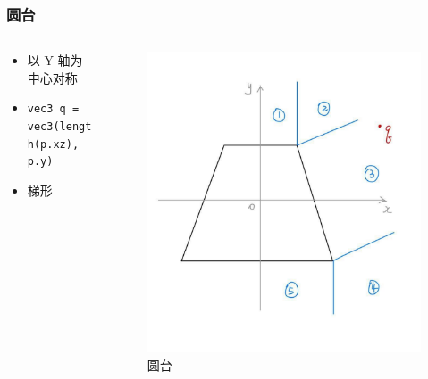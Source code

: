 \documentclass[aspectratio=169]{ctexbeamer} %
\begin{document}
\begin{frame}
    \frametitle{圆台} %
    \begin{columns}
        \begin{column}{.6\textwidth}
            \begin{itemize}
                \item 以 Y 轴为中心对称
                \item \texttt{vec3 q = vec3(length(p.xz), p.y)}
                \item 梯形
            \end{itemize}
        \end{column}
        \begin{column}{.4\textwidth}
            \begin{figure}[htbp]
                \centering
                \includegraphics[height=.65\textheight]{images/pre/cone_derive.pdf}
                \caption{圆台}
                \label{fig:cone_derive}
            \end{figure}
        \end{column}
    \end{columns}
\end{frame}
\end{document}
